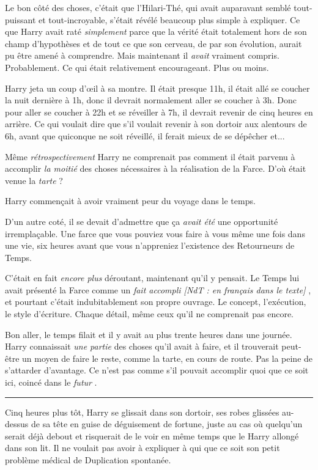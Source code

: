 Le bon côté des choses, c'était que l'Hilari-Thé, qui avait auparavant semblé tout-puissant et tout-incroyable, s'était révélé beaucoup plus simple à expliquer. Ce que Harry avait raté \emph{simplement}  parce que la vérité était totalement hors de son champ d'hypothèses et de tout ce que son cerveau, de par son évolution, aurait pu être amené à comprendre. Mais maintenant il \emph{avait}  vraiment compris. Probablement. Ce qui était relativement encourageant. Plus ou moins.

Harry jeta un coup d'œil à sa montre. Il était presque 11h, il était allé se coucher la nuit dernière à 1h, donc il devrait normalement aller se coucher à 3h. Donc pour aller se coucher à 22h et se réveiller à 7h, il devrait revenir de cinq heures en arrière. Ce qui voulait dire que s'il voulait revenir à son dortoir aux alentours de 6h, avant que quiconque ne soit réveillé, il ferait mieux de se dépêcher et...

Même \emph{rétrospectivement}  Harry ne comprenait pas comment il était parvenu à accomplir \emph{la moitié}  des choses nécessaires à la réalisation de la Farce. D'où était venue la \emph{tarte}  ?

Harry commençait à avoir vraiment peur du voyage dans le temps.

D'un autre coté, il se devait d'admettre que ça \emph{avait été}  une opportunité irremplaçable. Une farce que vous pouviez vous faire à vous même une fois dans une vie, six heures avant que vous n'appreniez l'existence des Retourneurs de Temps.

C'était en fait \emph{encore plus}  déroutant, maintenant qu'il y pensait. Le Temps lui avait présenté la Farce comme un \emph{fait accompli [NdT : en français dans le texte]} , et pourtant c'était indubitablement son propre ouvrage. Le concept, l'exécution, le style d'écriture. Chaque détail, même ceux qu'il ne comprenait pas encore.

Bon aller, le temps filait et il y avait au plus trente heures dans une journée. Harry connaissait \emph{une partie}  des choses qu'il avait à faire, et il trouverait peut-être un moyen de faire le reste, comme la tarte, en cours de route. Pas la peine de s'attarder d'avantage. Ce n'est pas comme s'il pouvait accomplir quoi que ce soit ici, coincé dans le \emph{futur} .
\par\noindent\rule{\textwidth}{0.4pt}
Cinq heures plus tôt, Harry se glissait dans son dortoir, ses robes glissées au-dessus de sa tête en guise de déguisement de fortune, juste au cas où quelqu'un serait déjà debout et risquerait de le voir en même temps que le Harry allongé dans son lit. Il ne voulait pas avoir à expliquer à qui que ce soit son petit problème médical de Duplication spontanée.

